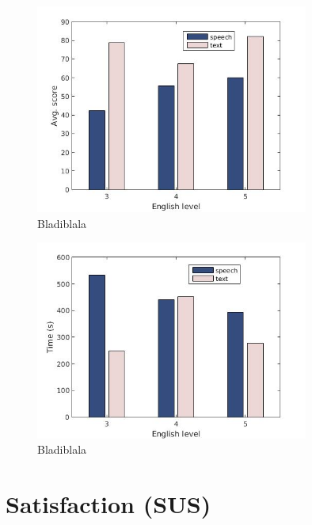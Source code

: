 \begin{figure}[p]
  \centering
  \includegraphics[width=0.8\textwidth]{images/english_score.jpg}
  \caption{Bladiblala}\label{eng_score}
\end{figure}

\begin{figure}[p]
  \centering
  \includegraphics[width=0.8\textwidth]{images/english_time.jpg}
  \caption{Bladiblala}\label{eng_time}
\end{figure}


\section{Satisfaction (SUS)}

